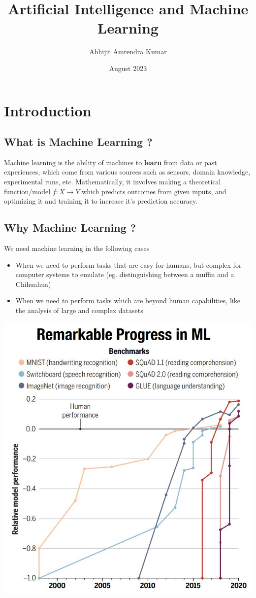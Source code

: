 \documentclass{report}
\title{Artificial Intelligence and Machine Learning}
\author{Abhijit Amrendra Kumar}
\date{August 2023}
\begin{document}
\maketitle

\chapter{Introduction}
\section{What is Machine Learning ?}

Machine learning is the ability of machines to \textbf{learn} from data or past experiences, which come from various sources such as sensors, domain knowledge, experimental runs, etc. Mathematically, it involves making a theoretical function/model $f: X \rightarrow Y$ which predicts outcomes from given inputs, and optimizing it and training it to increase it's prediction accuracy.

\section{Why Machine Learning ?}

We need machine learning in the following cases
\begin{itemize}
  \item When we need to perform tasks that are easy for humans, but complex for computer systems to emulate (eg. distinguishing between a muffin and a Chihuahua)
  \item When we need to perform tasks which are beyond human capabilities, like the analysis of large and complex datasets
\end{itemize}

\begin{center}
  \includegraphics[scale=0.25]{"images/01.jpg"}
\end{center}
\end{document}
